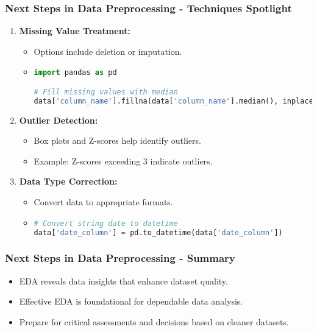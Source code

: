 \documentclass[aspectratio=169]{beamer}
\begin{document}
\begin{frame}[fragile]
    \frametitle{Next Steps in Data Preprocessing - Techniques Spotlight}
    \begin{enumerate}
        \item \textbf{Missing Value Treatment:}
            \begin{itemize}
                \item Options include deletion or imputation.
                \item \begin{lstlisting}[language=Python]
import pandas as pd

# Fill missing values with median
data['column_name'].fillna(data['column_name'].median(), inplace=True)
                \end{lstlisting}
            \end{itemize}
        \item \textbf{Outlier Detection:}
            \begin{itemize}
                \item Box plots and Z-scores help identify outliers.
                \item Example: Z-scores exceeding 3 indicate outliers.
            \end{itemize}
        \item \textbf{Data Type Correction:}
            \begin{itemize}
                \item Convert data to appropriate formats.
                \item \begin{lstlisting}[language=Python]
# Convert string date to datetime
data['date_column'] = pd.to_datetime(data['date_column'])
                \end{lstlisting}
            \end{itemize}
    \end{enumerate}
\end{frame}

\begin{frame}[fragile]
    \frametitle{Next Steps in Data Preprocessing - Summary}
    \begin{itemize}
        \item EDA reveals data insights that enhance dataset quality.
        \item Effective EDA is foundational for dependable data analysis.
        \item Prepare for critical assessments and decisions based on cleaner datasets.
    \end{itemize}
\end{frame}
\end{document}
